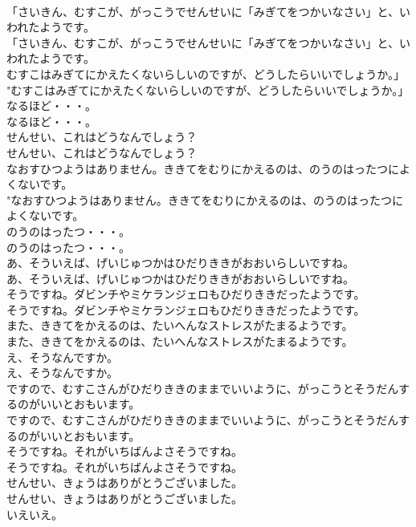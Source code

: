 \documentclass[8pt]{extreport}
\begin{document}
\begin{CJK}{UTF8}{min}
\\	「さいきん、むすこが、がっこうでせんせいに「みぎてをつかいなさい」と、いわれたようです。	
\\	「さいきん、むすこが、がっこうでせんせいに「みぎてをつかいなさい」と、いわれたようです。 
\\	むすこはみぎてにかえたくないらしいのですが、どうしたらいいでしょうか。」	
\\	"むすこはみぎてにかえたくないらしいのですが、どうしたらいいでしょうか。」 
\\	なるほど・・・。	
\\	なるほど・・・。 
\\	せんせい、これはどうなんでしょう？	
\\	せんせい、これはどうなんでしょう？ 
\\	なおすひつようはありません。ききてをむりにかえるのは、のうのはったつによくないです。	
\\	"なおすひつようはありません。ききてをむりにかえるのは、のうのはったつによくないです。 
\\	のうのはったつ・・・。	
\\	のうのはったつ・・・。 
\\	あ、そういえば、げいじゅつかはひだりききがおおいらしいですね。	
\\	あ、そういえば、げいじゅつかはひだりききがおおいらしいですね。 
\\	そうですね。ダビンチやミケランジェロもひだりききだったようです。	
\\	そうですね。ダビンチやミケランジェロもひだりききだったようです。 
\\	また、ききてをかえるのは、たいへんなストレスがたまるようです。	
\\	また、ききてをかえるのは、たいへんなストレスがたまるようです。 
\\	え、そうなんですか。	
\\	え、そうなんですか。 
\\	ですので、むすこさんがひだりききのままでいいように、がっこうとそうだんするのがいいとおもいます。	
\\	ですので、むすこさんがひだりききのままでいいように、がっこうとそうだんするのがいいとおもいます。 
\\	そうですね。それがいちばんよさそうですね。	
\\	そうですね。それがいちばんよさそうですね。 
\\	せんせい、きょうはありがとうございました。	
\\	せんせい、きょうはありがとうございました。 
\\	いえいえ。	

\end{CJK}
\end{document}
